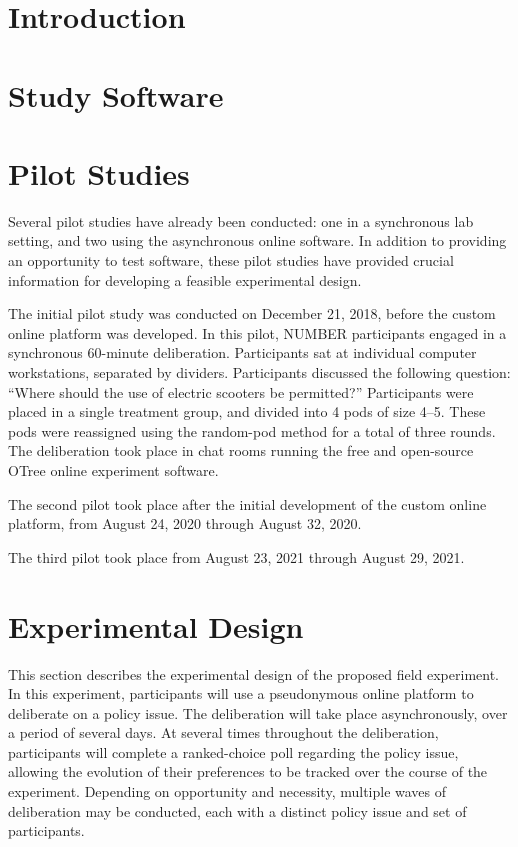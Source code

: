\section{Introduction}


\section{Study Software}


\section{Pilot Studies}
Several pilot studies have already been conducted:
one in a synchronous lab setting, and two using the asynchronous online
software.
In addition to providing an opportunity to test software,
these pilot studies have provided crucial information for developing a
feasible experimental design.

The initial pilot study was conducted on December 21, 2018,
before the custom online platform was developed.
In this pilot, NUMBER participants engaged in a synchronous 60-minute deliberation.
Participants sat at individual computer workstations, separated by dividers.
Participants discussed the following question:
``Where should the use of electric scooters be permitted?''
Participants were placed in a single treatment group, and divided into 4
pods of size 4--5.
These pods were reassigned using the random-pod method for a total of three
rounds.
The deliberation took place in chat rooms running the free and open-source
OTree online experiment software.

The second pilot took place after the initial development of the custom online
platform, from August 24, 2020 through August 32, 2020.

The third pilot took place from August 23, 2021 through August 29, 2021.


\section{Experimental Design}

This section describes the experimental design of the proposed field experiment.
In this experiment, participants will use a pseudonymous online platform
to deliberate on a policy issue.
The deliberation will take place asynchronously, over a period of several days.
At several times throughout the deliberation,
participants will complete a ranked-choice poll regarding the policy issue,
allowing the evolution of their preferences to be tracked over the course of the
experiment.
Depending on opportunity and necessity, multiple waves of deliberation may
be conducted, each with a distinct policy issue and set of participants.


